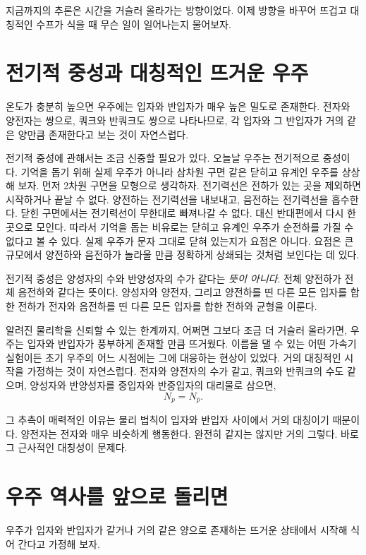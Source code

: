 지금까지의 추론은 시간을 거슬러 올라가는 방향이었다. 이제 방향을 바꾸어 뜨겁고 대칭적인 수프가 식을 때 무슨 일이 일어나는지 물어보자.

\section{전기적 중성과 대칭적인 뜨거운 우주}

온도가 충분히 높으면 우주에는 입자와 반입자가 매우 높은 밀도로 존재한다. 전자와 양전자는 쌍으로, 쿼크와 반쿼크도 쌍으로 나타나므로, 각 입자와 그 반입자가 거의 같은 양만큼 존재한다고 보는 것이 자연스럽다.

전기적 중성에 관해서는 조금 신중할 필요가 있다. 오늘날 우주는 전기적으로 중성이다. 기억을 돕기 위해 실제 우주가 아니라 삼차원 구면 같은 닫히고 유계인 우주를 상상해 보자. 먼저 2차원 구면을 모형으로 생각하자. 전기력선은 전하가 있는 곳을 제외하면 시작하거나 끝날 수 없다. 양전하는 전기력선을 내보내고, 음전하는 전기력선을 흡수한다. 닫힌 구면에서는 전기력선이 무한대로 빠져나갈 수 없다. 대신 반대편에서 다시 한곳으로 모인다. 따라서 기억을 돕는 비유로는 닫히고 유계인 우주가 순전하를 가질 수 없다고 볼 수 있다. 실제 우주가 문자 그대로 닫혀 있는지가 요점은 아니다. 요점은 큰 규모에서 양전하와 음전하가 놀라울 만큼 정확하게 상쇄되는 것처럼 보인다는 데 있다.

전기적 중성은 양성자의 수와 반양성자의 수가 같다는 \emph{뜻이 아니다}. 전체 양전하가 전체 음전하와 같다는 뜻이다. 양성자와 양전자, 그리고 양전하를 띤 다른 모든 입자를 합한 전하가 전자와 음전하를 띤 다른 모든 입자를 합한 전하와 균형을 이룬다.

알려진 물리학을 신뢰할 수 있는 한계까지, 어쩌면 그보다 조금 더 거슬러 올라가면, 우주는 입자와 반입자가 풍부하게 존재할 만큼 뜨거웠다. 이름을 댈 수 있는 어떤 가속기 실험이든 초기 우주의 어느 시점에는 그에 대응하는 현상이 있었다. 거의 대칭적인 시작을 가정하는 것이 자연스럽다. 전자와 양전자의 수가 같고, 쿼크와 반쿼크의 수도 같으며, 양성자와 반양성자를 중입자와 반중입자의 대리물로 삼으면,
\[
N_p = N_{\bar p}.
\]

그 추측이 매력적인 이유는 물리 법칙이 입자와 반입자 사이에서 거의 대칭이기 때문이다. 양전자는 전자와 매우 비슷하게 행동한다. 완전히 같지는 않지만 거의 그렇다. 바로 그 근사적인 대칭성이 문제다.

\section{우주 역사를 앞으로 돌리면}

우주가 입자와 반입자가 같거나 거의 같은 양으로 존재하는 뜨거운 상태에서 시작해 식어 간다고 가정해 보자.

